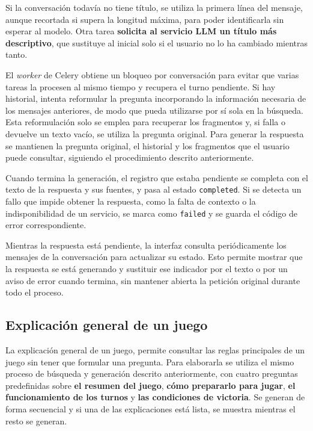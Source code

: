 Si la conversación todavía no tiene título, se utiliza la primera línea
del mensaje, aunque recortada si supera la longitud máxima, para poder identificarla
sin esperar al modelo. Otra tarea \textbf{solicita al servicio \ac{LLM} un título
más descriptivo}, que sustituye al inicial solo si el usuario no lo ha
cambiado mientras tanto.

El \textit{worker} de Celery obtiene un bloqueo por conversación para evitar
que varias tareas la procesen al mismo tiempo y recupera el turno pendiente.
Si hay historial, intenta reformular la pregunta incorporando la información
necesaria de los mensajes anteriores, de modo que pueda utilizarse por sí
sola en la búsqueda. Esta reformulación solo se emplea para recuperar los
fragmentos y, si falla o devuelve un texto vacío, se utiliza la pregunta
original. Para generar la respuesta se mantienen la pregunta original,
el historial y los fragmentos que el usuario puede consultar, siguiendo el
procedimiento descrito anteriormente.

Cuando termina la generación, el registro que estaba pendiente se completa
con el texto de la respuesta y sus fuentes, y pasa al estado
\texttt{completed}. Si se detecta un fallo que impide obtener la respuesta,
como la falta de contexto o la indisponibilidad de un servicio, se marca
como \texttt{failed} y se guarda el código de error correspondiente.

Mientras la respuesta está pendiente, la interfaz consulta periódicamente
los mensajes de la conversación para actualizar su estado. Esto permite
mostrar que la respuesta se está generando y sustituir ese indicador por
el texto o por un aviso de error cuando termina, sin mantener abierta la
petición original durante todo el proceso.


\FloatBarrier
\subsection{Explicación general de un juego}

La explicación general de un juego, permite consultar las reglas principales de un juego sin
tener que formular una pregunta. Para elaborarla se utiliza el mismo
proceso de búsqueda y generación descrito anteriormente, con cuatro
preguntas predefinidas sobre \textbf{el resumen del juego}, \textbf{cómo prepararlo para jugar}, \textbf{el funcionamiento de los
turnos} y \textbf{las condiciones de victoria}. Se generan de forma secuencial y si una de las explicaciones está lista, se muestra mientras el resto se generan.

